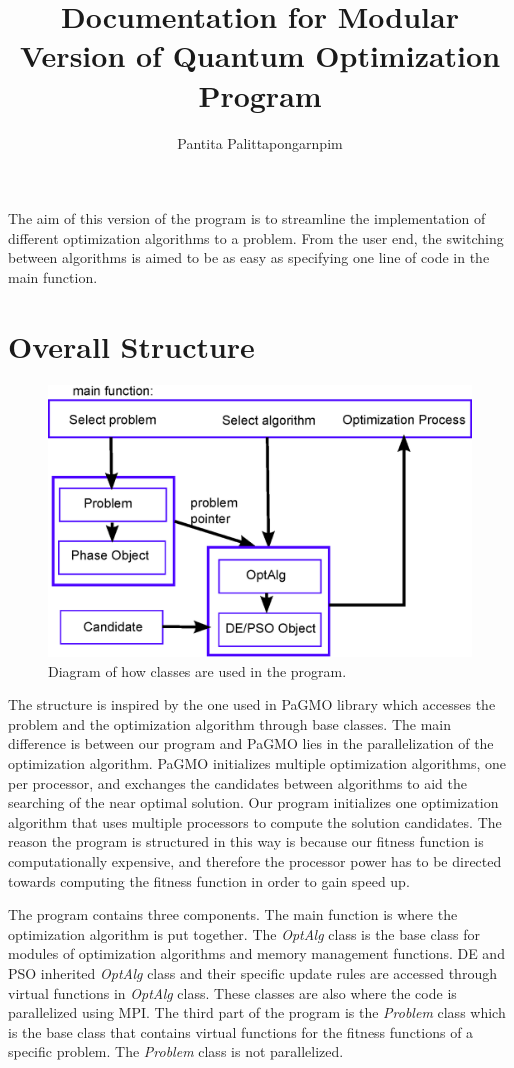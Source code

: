 \documentclass[12pt,letterpaper]{article}
\author{Pantita Palittapongarnpim}
\title{Documentation for Modular Version of Quantum Optimization Program}
\begin{document}
\maketitle

The aim of this version of the program is to streamline the implementation of different optimization algorithms to a problem. 
From the user end, the switching between algorithms is aimed to be as easy as specifying one line of code in the main function.

\section{Overall Structure}

\begin{figure}[h]
\centering
\includegraphics[width=0.7\linewidth]{diagram}
\caption{Diagram of how classes are used in the program.}
\label{fig:diagram}
\end{figure}

The structure is inspired by the one used in PaGMO library which accesses the problem and the optimization algorithm through base classes.
The main difference is between our program and PaGMO lies in the parallelization of the optimization algorithm.  
PaGMO initializes multiple optimization algorithms, one per processor, and exchanges the candidates between algorithms to aid the searching of the near optimal solution.
Our program initializes one optimization algorithm that uses multiple processors to compute the solution candidates. 
The reason the program is structured in this way is because our fitness function is computationally expensive, and therefore the processor power has to be directed towards computing the fitness function in order to gain speed up.
 
The program contains three components.
The main function is where the optimization algorithm is put together. 
The \textit{OptAlg} class is the base class for modules of optimization algorithms and memory management functions. 
DE and PSO inherited \textit{OptAlg} class and their specific update rules are accessed through virtual functions in \textit{OptAlg} class. 
These classes are also where the code is parallelized using MPI. 
The third part of the program is the \textit{Problem} class which is the base class that contains virtual functions for the fitness functions of a specific problem. 
The \textit{Problem} class is not parallelized.
\end{document}
